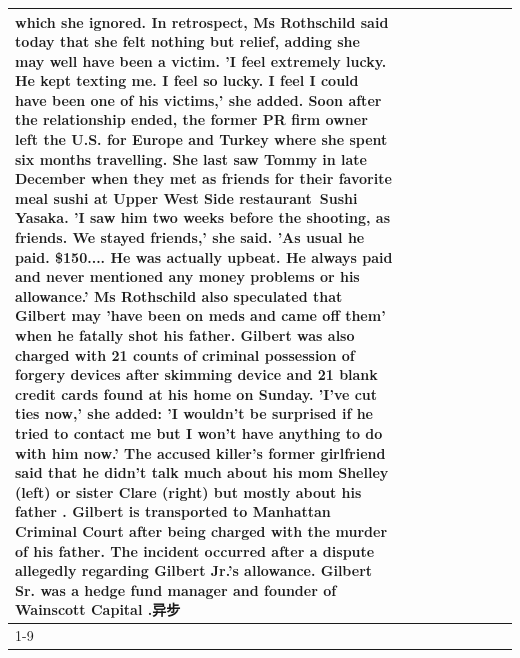 \begin{table}[H]
\begin{tabular}{lllrlllll}
which she ignored. In retrospect, Ms Rothschild said today that she felt nothing but relief, adding she may well have been a victim. 'I feel extremely lucky. He kept texting me. I feel so lucky. I feel I could have been one of his victims,' she added. Soon after the relationship ended, the former PR firm owner left the U.S. for Europe and Turkey where she spent six months  travelling. She last saw Tommy in late December when they met as friends for their favorite meal sushi at Upper West Side restaurant Sushi Yasaka. 'I saw him two weeks before the shooting, as friends. We stayed friends,' she said. 'As usual he paid. \$150.... He was actually upbeat. He always paid and never mentioned any money problems or his allowance.' Ms Rothschild also speculated that Gilbert may 'have been on meds and came off them' when he fatally shot his father. Gilbert was also charged with 21 counts of criminal possession of forgery devices after skimming device and 21 blank credit cards found at his home on Sunday. 'I've cut ties now,' she added: 'I wouldn’t be surprised if he tried to contact me but I won’t have anything to do with him now.' The accused killer's former girlfriend said that he didn't talk much about his mom Shelley (left) or sister Clare (right) but mostly about his father . Gilbert is transported to Manhattan Criminal Court  after being charged with the murder of his father. The incident occurred after a dispute allegedly regarding Gilbert Jr.'s allowance. Gilbert Sr. was a hedge fund manager and founder of Wainscott Capital .异步 \\
\cline{1-9} \cline{2-9}

\end{tabular}
\end{table}
